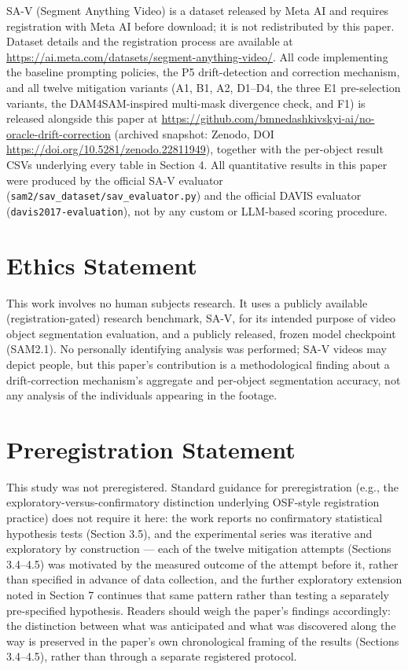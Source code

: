 \documentclass[11pt]{article}
\begin{document}
SA-V (Segment Anything Video) is a dataset released by Meta AI and requires registration with Meta AI before download; it is not redistributed by this paper. Dataset details and the registration process are available at \url{https://ai.meta.com/datasets/segment-anything-video/}. All code implementing the baseline prompting policies, the P5 drift-detection and correction mechanism, and all twelve mitigation variants (A1, B1, A2, D1–D4, the three E1 pre-selection variants, the DAM4SAM-inspired multi-mask divergence check, and F1) is released alongside this paper at \url{https://github.com/bmnedashkivskyi-ai/no-oracle-drift-correction} (archived snapshot: Zenodo, DOI \url{https://doi.org/10.5281/zenodo.22811949}), together with the per-object result CSVs underlying every table in Section 4. All quantitative results in this paper were produced by the official SA-V evaluator (\texttt{sam2/sav\_dataset/sav\_evaluator.py}) and the official DAVIS evaluator (\texttt{davis2017-evaluation}), not by any custom or LLM-based scoring procedure.

\section*{Ethics Statement}

This work involves no human subjects research. It uses a publicly available (registration-gated) research benchmark, SA-V, for its intended purpose of video object segmentation evaluation, and a publicly released, frozen model checkpoint (SAM2.1). No personally identifying analysis was performed; SA-V videos may depict people, but this paper's contribution is a methodological finding about a drift-correction mechanism's aggregate and per-object segmentation accuracy, not any analysis of the individuals appearing in the footage.

\section*{Preregistration Statement}

This study was not preregistered. Standard guidance for preregistration (e.g., the exploratory-versus-confirmatory distinction underlying OSF-style registration practice) does not require it here: the work reports no confirmatory statistical hypothesis tests (Section 3.5), and the experimental series was iterative and exploratory by construction — each of the twelve mitigation attempts (Sections 3.4–4.5) was motivated by the measured outcome of the attempt before it, rather than specified in advance of data collection, and the further exploratory extension noted in Section 7 continues that same pattern rather than testing a separately pre-specified hypothesis. Readers should weigh the paper's findings accordingly: the distinction between what was anticipated and what was discovered along the way is preserved in the paper's own chronological framing of the results (Sections 3.4–4.5), rather than through a separate registered protocol.
\end{document}
